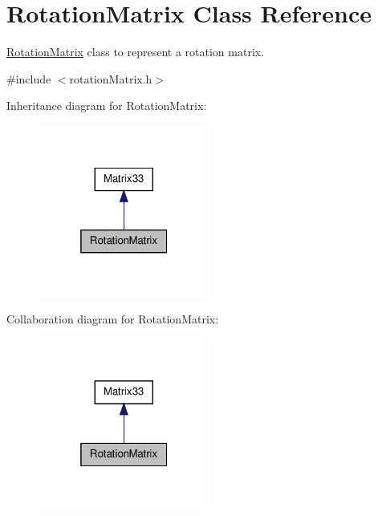 \hypertarget{classRotationMatrix}{\section{\-Rotation\-Matrix \-Class \-Reference}
\label{d2/d4a/classRotationMatrix}
}


\hyperlink{classRotationMatrix}{\-Rotation\-Matrix} class to represent a rotation matrix.  




{\ttfamily \#include $<$rotation\-Matrix.\-h$>$}



\-Inheritance diagram for \-Rotation\-Matrix\-:
\nopagebreak
\begin{figure}[H]
\begin{center}
\leavevmode
\includegraphics[width=160pt]{d5/d4d/classRotationMatrix__inherit__graph}
\end{center}
\end{figure}


\-Collaboration diagram for \-Rotation\-Matrix\-:
\nopagebreak
\begin{figure}[H]
\begin{center}
\leavevmode
\includegraphics[width=160pt]{d5/dc0/classRotationMatrix__coll__graph}
\end{center}
\end{figure}
